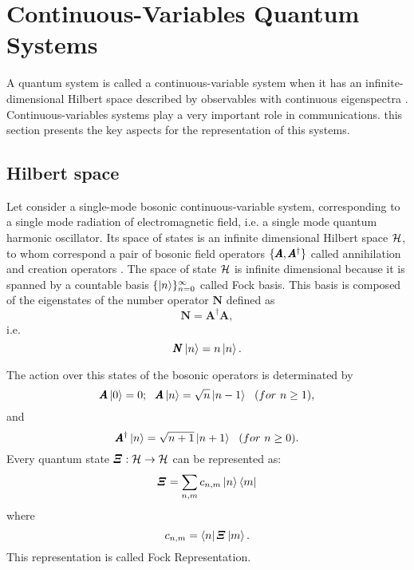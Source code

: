 \section{Continuous-Variables Quantum Systems}
    A quantum system is called a continuous-variable system
    when it has an infinite-dimensional Hilbert space described
    by observables with continuous eigenspectra \cite{ContinuousVar}.
    Continuous-variables systems play a very important role in communications. this
    section presents the key aspects for the representation of this systems.
            
    \subsection{Hilbert space}
        Let consider a single-mode bosonic continuous-variable system, corresponding to a single
        mode radiation of electromagnetic field, i.e. a single mode quantum harmonic oscillator.
        Its space of states is an infinite dimensional Hilbert space $\mathcal{H}$, to whom correspond
        a pair of bosonic field operators $\{ \Operator{A},\Operator{A}^{\dagger}\}$ called annihilation
        and creation operators \cite{ContinuousVar}.
        The space of state $\mathcal{H}$ is infinite dimensional because it is spanned by a countable
        basis $\{\ket{n}\}_{n=0}^\infty$ called Fock basis. This basis is composed of the
        eigenstates of the number operator $\pmb{N}$ defined as
        \begin{equation}
            \pmb{N}=\pmb{A}^\dagger \pmb{A},
        \end{equation}
        i.e. 
        \begin{equation*}
            \pmb{N}\ket{n}=n\ket{n}.
        \end{equation*}

        The action over this states of the bosonic operators is determinated by \cite{ContinuousVar}
        \begin{equation}
            \pmb{A}\ket{0}=0;\ \ \pmb{A}\ket{n}=\sqrt{n}\ket{n-1}\ \ (for\ n \geq 1),
        \end{equation}
        and
        \begin{equation*}
            \pmb{A}^\dagger\ket{n}=\sqrt{n+1}\ket{n+1}\ \ (for\ n \geq 0).
        \end{equation*}
        Every quantum state $\Operator{\varXi}:\Hilbert\to\Hilbert$ can be represented as:
        \begin{equation}
            \Operator{\varXi}=\sum_{n,m} c_{n,m} \ket{n}\bra{m}
            \label{eq:FockRep}
        \end{equation}
        where
        \begin{equation}
            c_{n,m}=\bra{n}\Operator{\varXi}\ket{m}.
        \end{equation}
        This representation is called Fock Representation.
        
